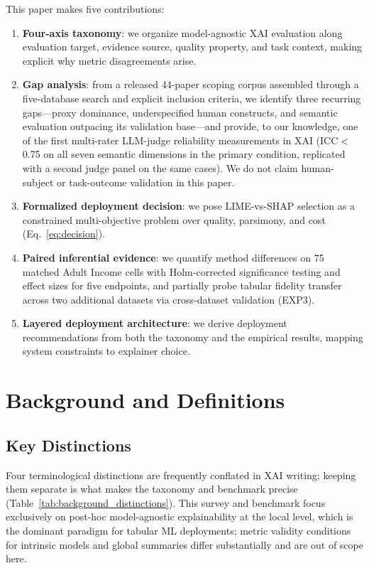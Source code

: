 \documentclass[10pt]{article}
\begin{document}
This paper makes five contributions:
\begin{enumerate}[leftmargin=*]
\item \textbf{Four-axis taxonomy}: we organize model-agnostic XAI
evaluation along evaluation target, evidence source, quality property,
and task context, making explicit why metric disagreements arise.
\item \textbf{Gap analysis}: from a released 44-paper scoping corpus
assembled through a five-database search and explicit inclusion criteria,
we identify three recurring gaps---proxy dominance, underspecified human constructs, and semantic
evaluation outpacing its validation base---and provide, to our
knowledge, one of the first multi-rater LLM-judge reliability measurements in
XAI (ICC$<$0.75 on all seven semantic dimensions in the primary condition,
replicated with a second judge panel on the same cases). We do not claim
human-subject or task-outcome validation in this paper.
\item \textbf{Formalized deployment decision}: we pose LIME-vs-SHAP
selection as a constrained multi-objective problem over quality, parsimony,
and cost (Eq.~\ref{eq:decision}).
\item \textbf{Paired inferential evidence}: we quantify method differences
on 75 matched Adult Income cells with Holm-corrected significance testing
and effect sizes for five endpoints, and partially probe tabular fidelity
transfer across two additional datasets via cross-dataset validation
(EXP3).
\item \textbf{Layered deployment architecture}: we derive deployment
recommendations from both the taxonomy and the empirical results, mapping
system constraints to explainer choice.
\end{enumerate}

\section{Background and Definitions}
\label{sec:background}

\subsection{Key Distinctions}

Four terminological distinctions are frequently conflated in XAI writing;
keeping them separate is what makes the taxonomy and benchmark precise
(Table~\ref{tab:background_distinctions}). This survey and benchmark focus
exclusively on post-hoc model-agnostic explainability at the local level,
which is the dominant paradigm for tabular ML deployments; metric validity
conditions for intrinsic models and global summaries differ substantially
and are out of scope here.
\end{document}
